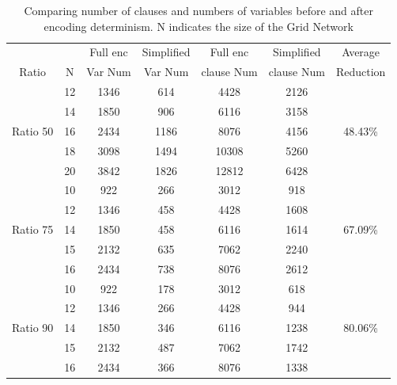 \begin{table}[]
    \centering
    \begin{tabular}{c c | c c  c c c }
        \hline
        &	&	Full enc	&	Simplified 	&	Full enc & Simplified &	Average\\
        Ratio & N	&   Var Num	&   Var Num	&	clause Num	& clause Num & 	Reduction\\
        \hline
        \hline
                &12	&	1346 	& 	614	&	 4428 	&	2126 &	\\
                &14	&	1850 	&	906	&	 6116 	&	3158 &	 \\
        Ratio 50&16	&	2434    &	1186	&	 8076 	&	4156 &	48.43\%\\
                &18	&	3098    &	1494	&	 10308 	&	5260 &	\\
                &20	&	3842 	&	1826	&	 12812 	&	6428 &	\\
        \hline
                &10	&	922	    &	266	&	3012	&	918 &	\\
                &12	&	1346	&	458	&	4428	&	1608 &	\\
       Ratio 75 &14	&	1850	&	458	&	6116	&	1614 & 67.09\%	\\
                &15	&	2132	&	635	&	7062	&	2240 &	\\
                &16	&	2434	&	738	&	8076	&	2612 &	\\
        \hline
                &10	&	922	    &	178	&	3012	&	618	& \\
                &12	&	1346	&	266	&	4428	&	944	& \\
        Ratio 90&14	&	1850	&	346	&	6116	&	1238 & 80.06\%	\\
                &15	&	2132	&	487	&	7062	&	1742 &	\\
                &16	&	2434	&	366	&	8076	&	1338 &	\\
        \hline
        \hline
    \end{tabular}
    \caption{Comparing number of clauses and numbers of variables before and after encoding determinism. N indicates the size of the Grid Network}
    \label{tab:enc-determin}
\end{table}

